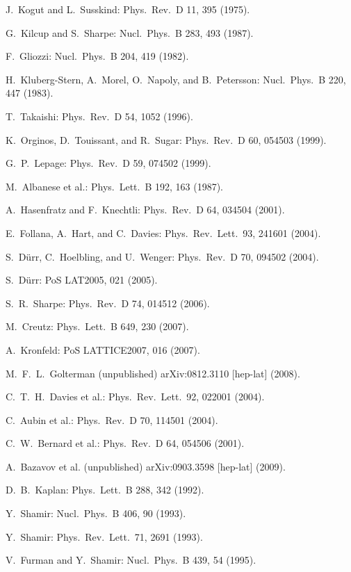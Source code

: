 \begin{enumerate}[label={[\arabic*]}]
  \item J.~Kogut and L.~Susskind: Phys.\ Rev.\ D 11, 395 (1975).
  \item G.~Kilcup and S.~Sharpe: Nucl.\ Phys.\ B 283, 493 (1987).
  \item F.~Gliozzi: Nucl.\ Phys.\ B 204, 419 (1982).
  \item H.~Kluberg-Stern, A.~Morel, O.~Napoly, and B.~Petersson: Nucl.\ Phys.\
        B 220, 447 (1983).
  \item T.~Takaishi: Phys.\ Rev.\ D 54, 1052 (1996).
  \item K.~Orginos, D.~Touissant, and R.~Sugar: Phys.\ Rev.\ D 60, 054503
        (1999).
  \item G.~P.~Lepage: Phys.\ Rev.\ D 59, 074502 (1999).
  \item M.~Albanese et al.: Phys.\ Lett.\ B 192, 163 (1987).
  \item A.~Hasenfratz and F.~Knechtli: Phys.\ Rev.\ D 64, 034504 (2001).
  \item E.~Follana, A.~Hart, and C.~Davies: Phys.\ Rev.\ Lett.\ 93, 241601
        (2004).
  \item S.~D\"urr, C.~Hoelbling, and U.~Wenger: Phys.\ Rev.\ D 70, 094502
        (2004).
  \item S.~D\"urr: PoS LAT2005, 021 (2005).
  \item S.~R.~Sharpe: Phys.\ Rev.\ D 74, 014512 (2006).
  \item M.~Creutz: Phys.\ Lett.\ B 649, 230 (2007).
  \item A.~Kronfeld: PoS LATTICE2007, 016 (2007).
  \item M.~F.~L.~Golterman (unpublished) arXiv:0812.3110 [hep-lat] (2008).
  \item C.~T.~H.~Davies et al.: Phys.\ Rev.\ Lett.\ 92, 022001 (2004).
  \item C.~Aubin et al.: Phys.\ Rev.\ D 70, 114501 (2004).
  \item C.~W.~Bernard et al.: Phys.\ Rev.\ D 64, 054506 (2001).
  \item A.~Bazavov et al. (unpublished) arXiv:0903.3598 [hep-lat] (2009).
  \item D.~B.~Kaplan: Phys.\ Lett.\ B 288, 342 (1992).
  \item Y.~Shamir: Nucl.\ Phys.\ B 406, 90 (1993).
  \item Y.~Shamir: Phys.\ Rev.\ Lett.\ 71, 2691 (1993).
  \item V.~Furman and Y.~Shamir: Nucl.\ Phys.\ B 439, 54 (1995).

\end{enumerate}
